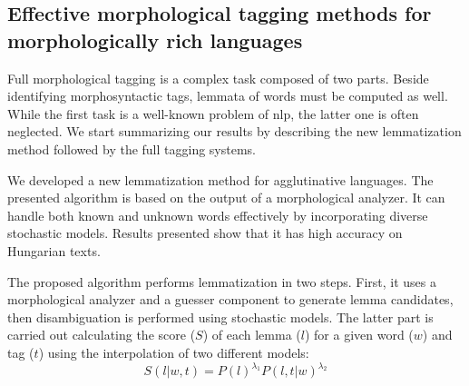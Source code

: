 \let\oldthesubsection=\thesubsection
\renewcommand{\thesubsection}{\Roman{subsection}}

%
%

\subsection{Effective morphological tagging methods for morphologically rich languages} %
\label{thes:morf}

Full morphological tagging is a complex task composed of two parts. 
Beside identifying morphosyntactic tags, lemmata of words must be computed as well.
While the first task is a well-known problem of \acrlong{nlp}, the latter one is often neglected.
We start summarizing our results by describing the new lemmatization method followed by the full tagging systems. 


\begin{core}
\begin{thesis}\label{thes:morf-lemma}
We developed a new lemmatization method for agglutinative languages.
The presented algorithm is based on the output of a morphological analyzer. It can handle both known and unknown words effectively by incorporating diverse stochastic models. 
Results presented show that it has high accuracy on Hungarian texts.
\end{thesis} 

\begin{pub}
\cite{Orosz2011,Orosz2012,Orosz2012a,Orosz2013a}
\end{pub}
\end{core}

The proposed algorithm performs lemmatization in two steps. 
First, it uses a morphological analyzer and a guesser component to generate lemma candidates, then disambiguation is performed using stochastic models.
The latter part is carried out calculating the score ($S$) of each lemma ($l$) for a given word ($w$) and tag ($t$) using the interpolation of two different models:
\begin{equation} %
S(l|w,t) = P(l)^{\lambda_1} P(l,t|w)^{\lambda_2}
\end{equation}

